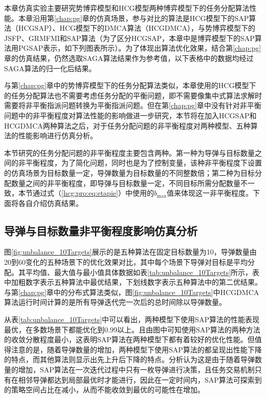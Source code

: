 本章仿真实验主要研究势博弈模型和HCG模型两种博弈模型下的任务分配算法性能。本章沿用第\ref{chap:pg}章的仿真场景，参与对比的算法是HCG模型下的SAP算法（HCGSAP）、HCG模型下的DMCA算法（HCGDMCA），与势博弈模型下的JSFP、GRMFMI和SAP算法（为了区分HCGSAP，本章中是博弈模型下的SAP算法用PGSAP表示，如下列图表所示）。为了体现出算法优化效果，结合第\ref{chap:pg}章的仿真结果，仍然选取SAGA算法结果作为参考值，以下表格中的数据均经过SAGA算法的归一化后结果。

与第\ref{chap:pg}章中的势博弈模型下的任务分配算法类似，本章使用的HCG模型下的任务分配算法也不需要考虑任务分配的平衡问题，即不需要像集中式算法求解时需要将非平衡指派问题转换为平衡指派问题。但在第\ref{chap:pg}章中没有针对非平衡问题中的非平衡程度对算法性能的影响做进一步研究，本节将在加入HCGSAP和HCGDMCA两种算法之后，对于任务分配问题的非平衡程度对两种模型、五种算法的性能影响进行仿真分析。

本节研究的任务分配问题的非平衡程度主要包含两种。第一种为导弹与目标数量之间的非平衡程度，为了简化问题，同时也是为了控制变量，该种非平衡程度下设置的仿真场景为目标数量一定，导弹数量为目标数量的不同整数倍；第二种为目标分配数量之间的非平衡程度，即导弹与目标数量一定，不同目标所需分配数量不一致，本节通过式（\ref{hcg:pro:eq:etapie}）中使用的$b_{\text{max}}$值来体现这一非平衡程度。下面将各自介绍仿真结果。

\subsection{导弹与目标数量非平衡程度影响仿真分析}
\label{hcg:sim:mtnumbers}

图\ref{fig:unbalance_10Targets}展示的是五种算法在固定目标数量为10，导弹数量由20到60变化的五种场景下的优化效果对比，其中每个场景下导弹对目标是平均分配。其平均值、最大值与最小值具体数据如表\ref{tab:unbalance_10Targets}所示，表中加粗数字表示五种算法中最优结果，下划线数字表示五种算法中的第二优结果。与第\ref{chap:pg}章中的分布式算法类似，图\ref{fig:unbalance_10Targets}中HCGDMCA算法运行时间计算的是所有导弹迭代完一次后的总时间除以导弹数量。

从表\ref{tab:unbalance_10Targets}中可以看出，两种模型下使用SAP算法的性能表现最优，在多数场景下都能优化到0.99以上。且由图中可知使用SAP算法的两种方法的收敛分散程度最小，这表明SAP算法在两种模型下都有着较好的优化性能。但值得注意的是，随着导弹数量的增加，两种模型下使用SAP算法的都呈现出性能下降的特点，而其他算法则显示出先上升后下降的特点。分析认为这是由于随着导弹数量的增加，SAP算法在一次迭代过程中只有一枚导弹进行决策，且任务交易机制只有在相邻导弹都达到局部最优时才能进行，因此在一定时间内，SAP算法可探索到的策略空间占比在减小，从而不能收敛到最优的可能性在增加。



